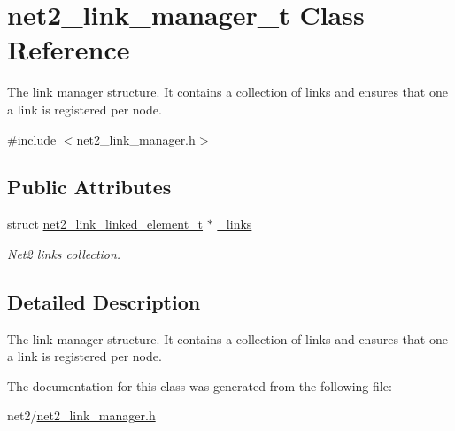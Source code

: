 \hypertarget{structnet2__link__manager__t}{\section{net2\-\_\-link\-\_\-manager\-\_\-t Class Reference}
\label{structnet2__link__manager__t}
}


The link manager structure. It contains a collection of links and ensures that one a link is registered per node.  




{\ttfamily \#include $<$net2\-\_\-link\-\_\-manager.\-h$>$}

\subsection*{Public Attributes}
\begin{DoxyCompactItemize}
\item 
\hypertarget{structnet2__link__manager__t_af6acfc2ac12140909d049f52d881d78a}{struct \hyperlink{structnet2__link__linked__element__t}{net2\-\_\-link\-\_\-linked\-\_\-element\-\_\-t} $\ast$ \hyperlink{structnet2__link__manager__t_af6acfc2ac12140909d049f52d881d78a}{\-\_\-links}}\label{structnet2__link__manager__t_af6acfc2ac12140909d049f52d881d78a}

\begin{DoxyCompactList}\small\item\em Net2 links collection. \end{DoxyCompactList}\end{DoxyCompactItemize}


\subsection{Detailed Description}
The link manager structure. It contains a collection of links and ensures that one a link is registered per node. 

The documentation for this class was generated from the following file\-:\begin{DoxyCompactItemize}
\item 
net2/\hyperlink{net2__link__manager_8h}{net2\-\_\-link\-\_\-manager.\-h}\end{DoxyCompactItemize}
